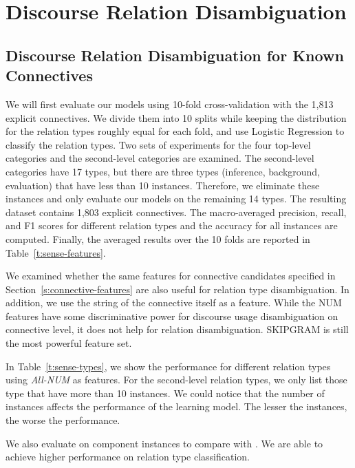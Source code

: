 \section{Discourse Relation Disambiguation}

\subsection{Discourse Relation Disambiguation for Known Connectives}

We will first evaluate our models using 10-fold cross-validation with the 1,813
explicit connectives. We divide them into 10 splits
while keeping the distribution for the relation types roughly equal for
each fold, and use Logistic Regression to classify the relation types.
Two sets of experiments for the four top-level
categories and the second-level categories are examined. The second-level categories
have 17 types, but there are three types (inference, background, evaluation)
that have less than 10 instances. Therefore, we eliminate these instances and only evaluate
our models on the remaining 14 types. The resulting dataset contains 1,803 explicit
connectives. The macro-averaged
precision, recall, and F1 scores for different relation types and the accuracy for
all instances are computed. Finally, the averaged results over
the 10 folds are reported in Table~\ref{t:sense-features}.

We examined whether the same features
for connective candidates specified in Section~\ref{s:connective-features} are
also useful for relation type disambiguation. In addition, we use the string
of the connective itself as a feature. While the NUM features have some
discriminative power for discourse usage disambiguation on connective level,
it does not help for relation disambiguation. SKIPGRAM is still the most powerful
feature set.



In Table~\ref{t:sense-types}, we show the performance for different relation types
using \textit{All-NUM} as features. For the second-level relation types, we only list
those type that have more than 10 instances. We could notice that the
number of instances affects the performance of the learning model. The
lesser the instances, the worse the performance.



We also evaluate on component instances to compare with \cite{li2015automatic}.
We are able to achieve higher performance on relation type classification.

